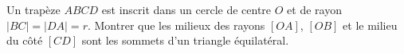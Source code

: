 Un trapèze $ABCD$ est inscrit dans un cercle de centre $O$ et de rayon $|BC| = |DA| = r$. Montrer que les milieux des rayons $[OA]$, $[OB]$ et le milieu du côté $[CD]$ sont les sommets d'un triangle équilatéral.
